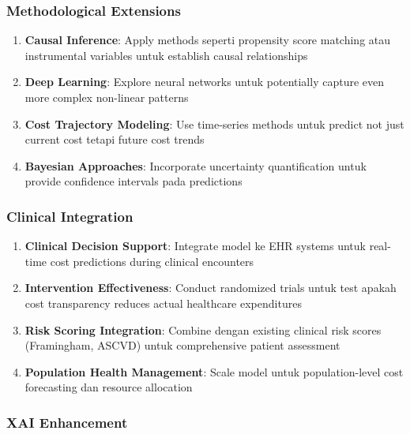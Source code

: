 \subsubsection{Methodological Extensions}

\begin{enumerate}
    \item \textbf{Causal Inference}: Apply methods seperti propensity score matching atau instrumental variables untuk establish causal relationships

    \item \textbf{Deep Learning}: Explore neural networks untuk potentially capture even more complex non-linear patterns

    \item \textbf{Cost Trajectory Modeling}: Use time-series methods untuk predict not just current cost tetapi future cost trends

    \item \textbf{Bayesian Approaches}: Incorporate uncertainty quantification untuk provide confidence intervals pada predictions
\end{enumerate}

\subsubsection{Clinical Integration}

\begin{enumerate}
    \item \textbf{Clinical Decision Support}: Integrate model ke EHR systems untuk real-time cost predictions during clinical encounters

    \item \textbf{Intervention Effectiveness}: Conduct randomized trials untuk test apakah cost transparency reduces actual healthcare expenditures
    \item \textbf{Risk Scoring Integration}: Combine dengan existing clinical risk scores (Framingham, ASCVD) untuk comprehensive patient assessment

    \item \textbf{Population Health Management}: Scale model untuk population-level cost forecasting dan resource allocation
\end{enumerate}

\subsubsection{XAI Enhancement}

